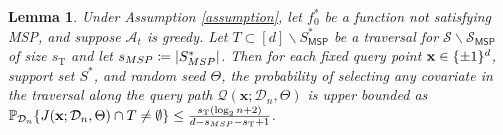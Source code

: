 \documentclass[11pt]{article}
\newtheorem{lemma}[theorem]{Lemma}
\newcommand{\bx}{\mathbf{x}}
\DeclarePairedDelimiter{\braces}{\lbrace}{\rbrace}
\DeclarePairedDelimiter{\abs}{|}{|}
\renewcommand{\P}{\mathbb{P}}
\newcommand{\binspace}{\braces{\pm 1}^\nfeats}
\newcommand{\sparsity}{s}
\newcommand{\nfeats}{d}
\newcommand{\nsamples}{n}
\newcommand{\coordindices}{[\nfeats]}
\newcommand{\data}[1][n]{\mathcal{D}_{#1}}
\newcommand{\MSP}{\textsf{MSP}}
\newcommand{\suppset}{S^*}
\newcommand{\traversal}{T}
\newcommand{\fcoefs}{\mathcal{S}}
\newcommand{\alg}{\mathcal{A}}
\newcommand{\querypath}{\mathcal{Q}}
\newcommand{\traversalsize}{\sparsity_{\operatorname{T}}}
\begin{document}
\begin{lemma}
    \label{lem:nonmsp_feature_selection_prob}
    Under Assumption \ref{assumption}, let $f_0^*$ be a function not satisfying \MSP, and suppose $\alg_t$ is greedy.
    Let $\traversal \subset \coordindices\backslash\suppset_{\MSP}$ be a traversal for $\fcoefs\backslash\fcoefs_{\MSP}$ of size $\traversalsize$ and let $\sparsity_{\MSP} \coloneqq \abs*{\suppset_{\MSP}}$.
    Then for each fixed query point $\bx \in \binspace$, support set $\suppset$, and random seed $\Theta$, the probability of selecting any covariate in the traversal along the query path $\querypath(\bx;\data,\Theta)$ is upper bounded as $\P_{\data}\braces*{J(\bx;\data,\Theta)\cap \traversal \neq \emptyset } \leq \frac{\traversalsize(\log_2 \nsamples + 2)}{\nfeats - \sparsity_{\MSP}-\traversalsize +1}$.
\end{lemma}
\end{document}
